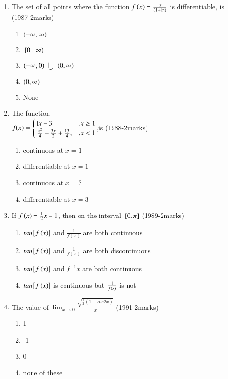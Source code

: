 \documentclass[journal]{IEEEtran}
\numberwithin{equation}{enumi}
\numberwithin{figure}{enumi}
\begin{document}
\begin{enumerate}
	\item The set of all points where the function $f\left(x\right)=\frac{x}{(1+\left\vert x\right\vert)}$ is differentiable, is \\ \hfill{(1987-2marks)}
		\begin{enumerate}
			\item $\left(- \infty, \infty\right)$
			\item ${}\left[0\right., \left.\infty\right)$
			\item $\left(- \infty,0\right)$ $\bigcup$ $\left(0, \infty\right)$
			\item $\left(0, \infty\right)$
			\item None 
		\end{enumerate}
	\item The function \\ $f(x)=\begin{cases}\left\vert x-3\right\vert & \text{,} x \geq 1 \\ \frac{x^2}{4}-\frac{3x}{2}+\frac{13}{4}, & \text{,} x<1 \end{cases}$,is \hfill{(1988-2marks)}
			\begin{enumerate}
				\item continuous at $x=1$
				\item differentiable at $x=1$
				\item continuous at $x=3$
				\item differentiable at $x=3$
			\end{enumerate}
		\item If $f\left(x\right) = \frac{1}{2}x-1$, then on the interval ${}\left[0,\pi\right]$ \hfill{(1989-2marks)}
			\begin{enumerate}
				\item $tan{}\left[f\left(x\right)\right]$ and $\frac{1}{f(x)}$ are both continuous
				\item $tan{}\left[f\left(x\right)\right]$ and $\frac{1}{f(x)}$ are both discontinuous
				\item $tan{}\left[f\left(x\right)\right]$ and $f^{-1}x$ are both continuous
				\item $tan{}\left[f\left(x\right)\right]$ is continuous but $\frac{1}{f\left(x\right)}$ is not
			\end{enumerate}
		\item The value of $\lim_{x\to0}{\frac{\sqrt{\frac{1}{2}(1-cos2x)}}{x}}$ \hfill{(1991-2marks)}
			\begin{enumerate}
				\item 1
				\item -1
				\item 0
				\item none of these 

\end{enumerate}
\end{enumerate}
\end{document}
